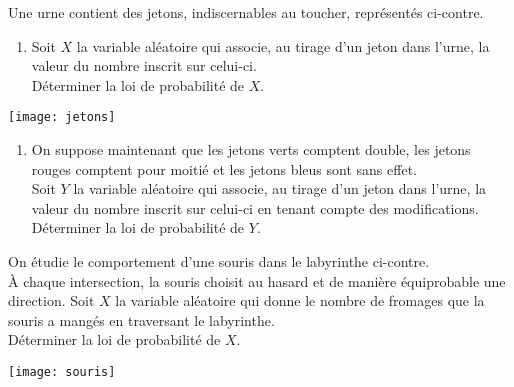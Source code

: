 \documentclass[a4paper,11pt,exos]{nsi} %
\begin{document}
\exo{}
\begin{minipage}{12cm}
	Une urne contient des jetons, indiscernables au toucher, représentés ci-contre.
	\begin{enumerate}
		\item 	Soit $X$ la variable aléatoire qui associe, au tirage d'un jeton dans l'urne, la valeur du nombre inscrit sur celui-ci.\\
		Déterminer la loi de probabilité de $X$.
	\end{enumerate}
\end{minipage}
\hspace{0.4cm}
\begin{minipage}{5cm}
	\texttt{[image: jetons]}
\end{minipage}
\begin{enumerate}[label=\bfseries 2.]
	\item 	On suppose maintenant que les jetons verts comptent double, les jetons rouges comptent pour moitié	et les jetons bleus sont sans effet.\\
	Soit $Y$ la variable aléatoire qui associe, au tirage d'un jeton dans l'urne, la valeur du nombre inscrit sur celui-ci en tenant compte des modifications.\\
	Déterminer la loi de probabilité de $Y$.
\end{enumerate}


\exo{}
\begin{minipage}{9cm}
	On étudie le comportement d'une souris dans le labyrinthe ci-contre.\\
	À chaque intersection, la souris choisit au hasard et de manière équiprobable une direction. Soit $X$ la variable aléatoire qui donne le nombre de fromages que la souris a mangés en traversant le labyrinthe.\\
	Déterminer la loi de probabilité de $X$.
\end{minipage}
\begin{minipage}{8.4cm}
	\texttt{[image: souris]}
\end{minipage}

\vspace{0.5cm}
\end{document}
